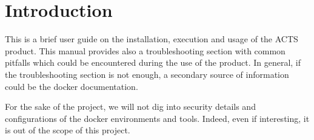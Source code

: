 \section{Introduction}\label{intro}

This is a brief user guide on the installation, execution and usage of the ACTS
product. This manual provides also a troubleshooting section with common
pitfalls which could be encountered during the use of the product. In general,
if the troubleshooting section is not enough, a secondary source of information
could be the docker documentation.

For the sake of the project, we will not dig into security details and
configurations of the docker environments and tools.
Indeed, even if interesting, it is out of the scope of this project.